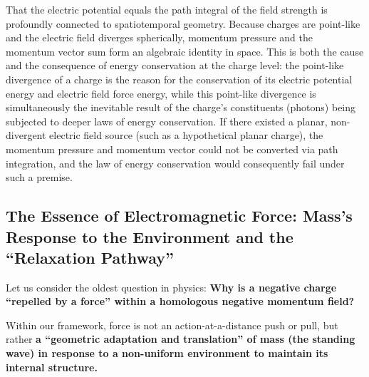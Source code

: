 \documentclass[12pt, a4paper]{article}
\begin{document}
That the electric potential equals the path integral of the field strength is profoundly connected to spatiotemporal geometry. Because charges are point-like and the electric field diverges spherically, momentum pressure and the momentum vector sum form an algebraic identity in space. This is both the cause and the consequence of energy conservation at the charge level: the point-like divergence of a charge is the reason for the conservation of its electric potential energy and electric field force energy, while this point-like divergence is simultaneously the inevitable result of the charge's constituents (photons) being subjected to deeper laws of energy conservation. If there existed a planar, non-divergent electric field source (such as a hypothetical planar charge), the momentum pressure and momentum vector could not be converted via path integration, and the law of energy conservation would consequently fail under such a premise.

\subsection{The Essence of Electromagnetic Force: Mass's Response to the Environment and the ``Relaxation Pathway''}

Let us consider the oldest question in physics: \textbf{Why is a negative charge ``repelled by a force'' within a homologous negative momentum field?}

Within our framework, force is not an action-at-a-distance push or pull, but rather \textbf{a ``geometric adaptation and translation'' of mass (the standing wave) in response to a non-uniform environment to maintain its internal structure.}
\end{document}
